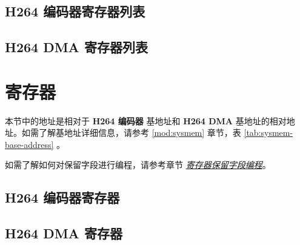 \documentclass[main\_\_CN.tex]{subfiles}
\begin{document}
\hypertarget{h264enc-reg-summ}{}
\subsection{H264 编码器寄存器列表}
\label{sec:h264enc-reg-summ}





\hypertarget{h264enc-dma-reg-summ}{}
\subsection{H264 DMA 寄存器列表}
\label{sec:h264enc-dma-reg-summ}






\clearpage
\section{寄存器}

本节中的地址是相对于 \textbf{H264 编码器} 基地址和 \textbf{H264 DMA} 基地址的相对地址。如需了解基地址详细信息，请参考 \ref{mod:sysmem} \textit{} 章节，表 \ref{tab:sysmem-base-address} \textit{}。

如需了解如何对保留字段进行编程，请参考章节 \hyperref[programming-reserved-field]{\textit{寄存器保留字段编程}}。


\subsection{H264 编码器寄存器}




\clearpage
\subsection{H264 DMA 寄存器}


\end{document}
